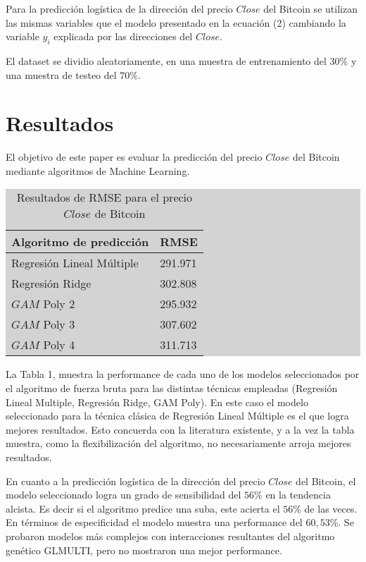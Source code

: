 \documentclass[a4paper,12pt,twocolumn]{article}
\begin{document}
Para la predicción logística de la dirección del precio $Close$ del Bitcoin se utilizan las mismas variables que el modelo presentado en la ecuación (2) cambiando la variable $y_i$ explicada por
las direcciones del $Close$.

El dataset se dividio aleatoriamente, en una muestra de entrenamiento del $30\%$ y una muestra de testeo del $70\%$.

\section{Resultados}

El objetivo de este paper es evaluar la predicción del precio  $Close$ del Bitcoin mediante algoritmos de Machine Learning. 

\begin{table}[!hbt]
\centering
\caption{Resultados de RMSE para el precio $Close$ de Bitcoin }

\begingroup\setlength{\fboxsep}{0pt}
\colorbox{lightgray}{%
\begin{tabular}{|l|l|}
\hline Algoritmo de predicción & RMSE \\
\hline Regresión Lineal Múltiple & 291.971 \\
\hline Regresión Ridge & 302.808 \\
\hline $GAM$ Poly 2   & 295.932 \\
\hline $GAM$ Poly 3   & 307.602 \\
\hline $GAM$ Poly 4   & 311.713 \\
\hline
\end{tabular}%
}\endgroup
\end{table}

La Tabla 1, muestra la performance de cada uno de los modelos seleccionados por el algoritmo de fuerza bruta para las distintas técnicas empleadas (Regresión Lineal Multiple, Regresión Ridge, GAM Poly). En este caso el modelo seleccionado para la técnica clásica de Regresión Lineal Múltiple es el que logra mejores resultados. Esto concuerda con la literatura existente, y a la vez la tabla muestra, como la flexibilización del algoritmo, no necesariamente arroja mejores resultados. 


En cuanto a la predicción logística de la dirección del precio $Close$ del Bitcoin, el modelo seleccionado  logra un  grado de sensibilidad del $56\%$ en la tendencia alcista. Es decir si el algoritmo predice una suba, este acierta el $56\%$ de las veces. En términos de especificidad el modelo muestra una performance del $60,53\%$. Se probaron modelos más complejos con interacciones resultantes del algoritmo genético GLMULTI, pero no mostraron una mejor performance. 
\end{document}
